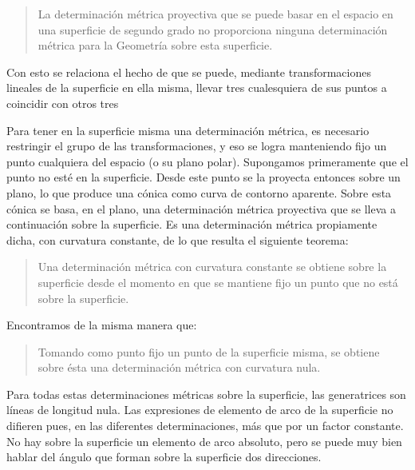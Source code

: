 \documentclass[a4paper, 12pt]{article}
\begin{document}
\begin{quote}\it 

La determinación métrica proyectiva que se puede basar en el espacio en una superficie de segundo grado no proporciona ninguna determinación métrica para la Geometría sobre esta superficie.

\end{quote} 

Con esto se relaciona el hecho de que se puede, mediante transformaciones lineales de la superficie en ella misma, llevar tres cualesquiera de sus puntos a coincidir con otros tres

Para tener en la superficie misma una determinación métrica, es necesario restringir el grupo de las transformaciones, y eso se logra manteniendo fijo un punto cualquiera del espacio (o su plano polar). Supongamos primeramente que el punto no esté en la superficie. Desde este punto se la proyecta entonces sobre un plano, lo que produce una cónica como curva de contorno aparente. Sobre esta cónica se basa, en el plano, una determinación métrica proyectiva que se lleva a continuación sobre la superficie. Es una determinación métrica propiamente dicha, con curvatura constante, de lo que resulta el siguiente teorema:

\begin{quote}\it 

Una determinación métrica con curvatura constante se obtiene sobre la superficie desde el momento en que se mantiene fijo un punto que no está sobre la superficie.

\end{quote} 

Encontramos de la misma manera que:

\begin{quote}\it 

Tomando como punto fijo un punto de la superficie misma, se obtiene sobre ésta una determinación métrica con curvatura nula.

\end{quote}

 Para todas estas determinaciones métricas sobre la superficie, las generatrices son líneas de longitud nula. Las expresiones de elemento de arco de la superficie no difieren pues, en las diferentes determinaciones, más que por un factor constante. No hay sobre la superficie un elemento de arco absoluto, pero se puede muy bien hablar del ángulo que forman sobre la superficie dos direcciones.
\end{document}
